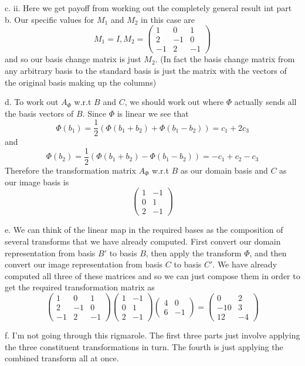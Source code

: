 \documentclass{article}
\newcommand{\chapternumber}{2}
\newenvironment{QandA}{\begin{enumerate}[label=\chapternumber.\arabic*]\bfseries\boldmath}
	{\end{enumerate}}
\newenvironment{answered}{\par\bigskip\normalfont\unboldmath}{}
\begin{document}
\begin{QandA}
\begin{answered}
			c. ii. Here we get payoff from working out the completely general result int part b. Our specific values for $M_1$ and $M_2$ in this case  are
			\[M_1 = I, M_2 = 
			\begin{pmatrix}
				1 & 0 & 1 \\
				2 & -1 & 0\\
				-1 & 2 & -1				
			\end{pmatrix}\]
			and so our basis change matrix is just $M_2$. (In fact the basis change matrix from any arbitrary basis to the standard basis is just the matrix with the vectors of the original basis making up the columns)
			
			d. To work out $A_\Phi$ w.r.t $B$ and $C$, we should work out where $\Phi$ actually sends all the basis vectors of $B$. Since $\Phi$ is linear we see that
			\[\Phi(b_1)=\frac{1}{2}(\Phi(b_1+b_2)+\Phi(b_1-b_2)) = c_1+2c_3\]
			and
			\[\Phi(b_2)=\frac{1}{2}(\Phi(b_1+b_2)-\Phi(b_1-b_2)) = -c_1+c_2-c_3\]
			Therefore the transformation matrix $A_\Phi$ w.r.t $B$ as our domain basis and $C$ as our image basis is
			\[\begin{pmatrix}
				1 & -1 \\
				0 & 1 \\
				2 & -1
			\end{pmatrix}\]
			
			e. We can think of the linear map in the required bases as the composition of several transforms that we have already computed. First convert our domain representation from basis $B'$ to basis $B$, then apply the transform $\Phi$, and then convert our image representation from basis $C$ to basis $C'$. We have already computed all three of these matrices and so we can just compose them in order to get the required transformation matrix as
			\[
			\begin{pmatrix}
				1 & 0 & 1 \\
				2 & -1 & 0\\
				-1 & 2 & -1				
			\end{pmatrix}
			\begin{pmatrix}
				1 & -1 \\
				0 & 1 \\
				2 & -1
			\end{pmatrix}
			\begin{pmatrix}
				4 & 0 \\
				6 & -1
			\end{pmatrix} = 
			\begin{pmatrix}
			0 & 2 \\
			-10 & 3 \\
			12 & -4
			\end{pmatrix}\]
			
			f. I'm not going through this rigmarole. The first three parts just involve applying the three constituent transformations in turn. The fourth is just applying the combined transform all at once.
		\end{answered}
	\end{QandA}
\end{document}
